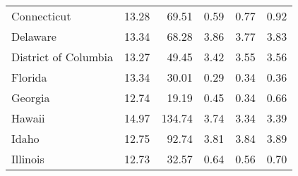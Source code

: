 \begin{longtable}{lrrrrr}
                Connecticut &      13.28 &     69.51 &       0.59 &        0.77 &         0.92 \\
                   Delaware &      13.34 &     68.28 &       3.86 &        3.77 &         3.83 \\
       District of Columbia &      13.27 &     49.45 &       3.42 &        3.55 &         3.56 \\
                    Florida &      13.34 &     30.01 &       0.29 &        0.34 &         0.36 \\
                    Georgia &      12.74 &     19.19 &       0.45 &        0.34 &         0.66 \\
                     Hawaii &      14.97 &    134.74 &       3.74 &        3.34 &         3.39 \\
                      Idaho &      12.75 &     92.74 &       3.81 &        3.84 &         3.89 \\
                   Illinois &      12.73 &     32.57 &       0.64 &        0.56 &         0.70 \\
\end{longtable}
